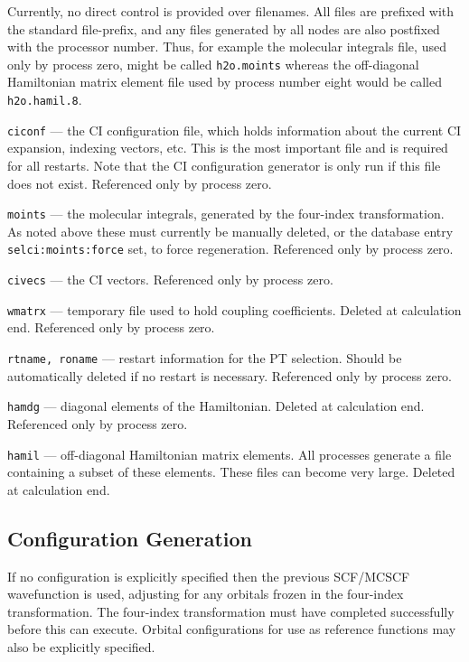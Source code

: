 Currently, no direct control is provided over filenames.  All files
are prefixed with the standard file-prefix, and any files generated by
all nodes are also postfixed with the processor number.  Thus, for
example the molecular integrals file, used only by process zero, might
be called {\tt h2o.moints} whereas the off-diagonal Hamiltonian matrix
element file used by process number eight would be called {\tt
  h2o.hamil.8}.

\sloppy

\begin{description}
\item{\tt ciconf} --- the CI configuration file, which holds
  information about the current CI expansion, indexing vectors, etc.
  This is the most important file and is required for all restarts.
  Note that the CI configuration generator is only run if this file
  does not exist. Referenced only by process zero.
\item{\tt moints} --- the molecular integrals, generated by the four-index
  transformation.  As noted above these must currently be manually
  deleted, or the database entry \verb+selci:moints:force+ set, to
  force regeneration.  Referenced only by process zero.
\item{\tt civecs} --- the CI vectors.    Referenced only by process zero.
\item{\tt wmatrx} --- temporary file used to hold coupling coefficients.
  Deleted at calculation end.  Referenced only by process zero.
\item{\tt rtname, roname} --- restart information for the PT
  selection.  Should be automatically deleted if no restart is
  necessary.  Referenced only by process zero.
\item{\tt hamdg} --- diagonal elements of the Hamiltonian.
  Deleted at calculation end.  Referenced only by process zero.
\item{\tt hamil} --- off-diagonal Hamiltonian matrix elements.  All
  processes generate a file containing a subset of these elements.
  These files can become very large.  Deleted at calculation end.
\end{description}

\fussy

\subsection{Configuration Generation}

If no configuration is explicitly specified then the previous
SCF/MCSCF wavefunction is used, adjusting for any orbitals frozen in
the four-index transformation.  The four-index transformation must
have completed successfully before this can execute.  Orbital
configurations for use as reference functions may also be explicitly
specified.


